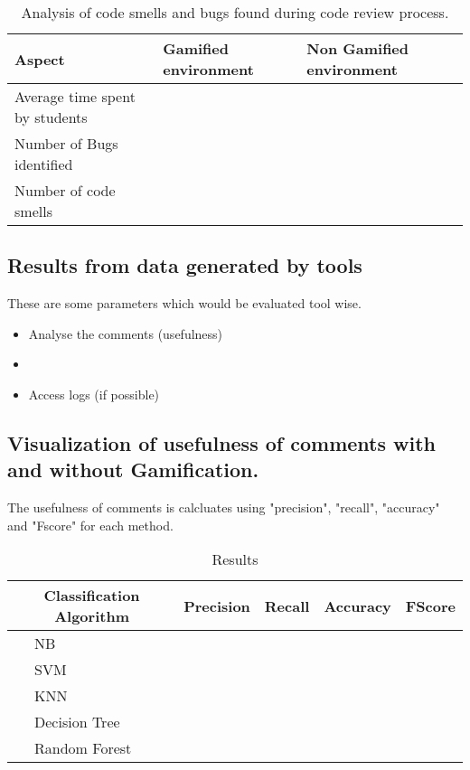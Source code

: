 \documentclass[conference]{IEEEtran}
\newcounter{magicrownumbers}
\newcommand\rownumber{\stepcounter{magicrownumbers}\arabic{magicrownumbers}}
\begin{document}
\begin{table}[h]
\centering
\caption{Analysis of code smells and bugs found during code review process.}
\begin{tabular}{|p{3.5cm}|p{2cm}|p{2cm}|} \hline
Aspect & Gamified environment & Non Gamified environment \\ \hline
Average time spent by students & & \\
Number of Bugs identified  & & \\
Number of code smells &  & \\
\hline
\end{tabular}
\label{tab:bugsandsmells}
\end{table}

\subsection{Results from data generated by tools}
These are some parameters which would be evaluated tool wise.
\begin{itemize}
\item Analyse the comments (usefulness)
\item 
\item Access logs (if possible)
\end{itemize}


\subsection{Visualization of usefulness of comments with and without Gamification.}
The usefulness of comments is calcluates using "precision", "recall", "accuracy" and "Fscore" for each method.

\begin{table}[h]
\centering
\caption{Results}
\begin{tabular}{|c|p{2cm}|c|c|c|c|}\hline
\multicolumn{2}{|c|}{Classification Algorithm} & Precision & Recall & Accuracy & FScore  \\ \hline \hline
 \setcounter{magicrownumbers}{0}\rownumber & NB & & & &  \\ 
 \rownumber & SVM & & & & \\
 \rownumber & KNN & & & & \\
 \rownumber & Decision Tree & & & & \\
 \rownumber & Random Forest & & & & \\
 \hline
\end{tabular}
\label{tab:results}
\end{table}
\end{document}
